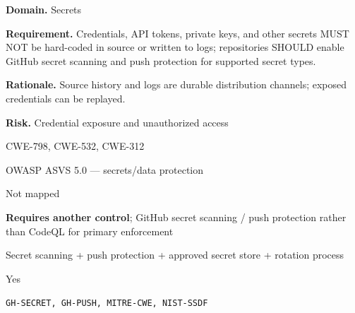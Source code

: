 \documentclass[10pt,letterpaper]{article}
\newcommand{\prioritybadge}[2]{\tcbox[on line,boxrule=0pt,arc=1.2mm,boxsep=0.7mm,left=1mm,right=1mm,top=0.4mm,bottom=0.4mm,colback=#2!12,coltext=#2]{\scriptsize\bfseries #1}}
\begin{document}
\begin{rulebox}[title={\texttt{SCS-ALL-SECRET-001} \hfill \prioritybadge{Critical Control}{Critical}}]
\textbf{Domain.} Secrets

\textbf{Requirement.} Credentials, API tokens, private keys, and other secrets MUST NOT be hard-coded in source or written to logs; repositories SHOULD enable GitHub secret scanning and push protection for supported secret types.

\textbf{Rationale.} Source history and logs are durable distribution channels; exposed credentials can be replayed.

\textbf{Risk.} Credential exposure and unauthorized access

\begin{description}[leftmargin=2.65cm,labelwidth=2.3cm,style=nextline,itemsep=1pt,topsep=3pt]
  \item[CWE] CWE-798, CWE-532, CWE-312
  \item[OWASP] OWASP ASVS 5.0 --- secrets/data protection
  \item[CERT] Not mapped
  \item[CodeQL] \textbf{Requires another control}; GitHub secret scanning / push protection rather than CodeQL for primary enforcement
  \item[Enforcement] Secret scanning + push protection + approved secret store + rotation process
  \item[Automation] Yes
  \item[Sources] \texttt{GH-SECRET, GH-PUSH, MITRE-CWE, NIST-SSDF}
\end{description}
\end{rulebox}
\end{document}
